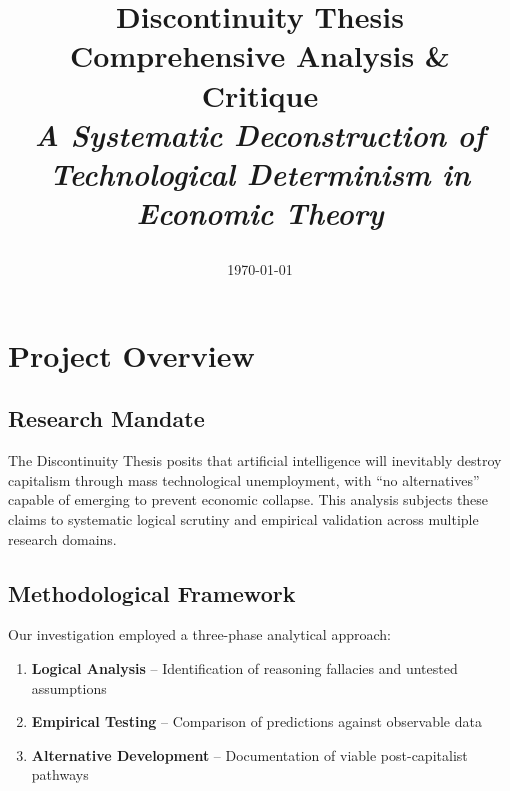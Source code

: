 \documentclass[11pt,a4paper]{article}
\title{
  \vspace{-1in}
  \begin{flushleft}
  \Huge\textbf{\textcolor{primaryblue}{Discontinuity Thesis}} \\
  \Large\textbf{\textcolor{secondaryblue}{Comprehensive Analysis \& Critique}} \\
  \vspace{0.5cm}
  \large\textit{A Systematic Deconstruction of Technological Determinism in Economic Theory}
  \end{flushleft}
}
\author{}
\date{\today}
\newcommand{\emphasis}[1]{\textbf{\textcolor{primaryblue}{#1}}}
\begin{document}
\maketitle
\thispagestyle{empty}

\begin{center}
\end{center}

\vspace{1cm}

\section{Project Overview}

\subsection{Research Mandate}

The Discontinuity Thesis posits that artificial intelligence will inevitably destroy capitalism through mass technological unemployment, with ``no alternatives'' capable of emerging to prevent economic collapse. This analysis subjects these claims to systematic logical scrutiny and empirical validation across multiple research domains.

\subsection{Methodological Framework}

Our investigation employed a three-phase analytical approach:

\begin{enumerate}[leftmargin=*]
\item \emphasis{Logical Analysis} -- Identification of reasoning fallacies and untested assumptions
\item \emphasis{Empirical Testing} -- Comparison of predictions against observable data
\item \emphasis{Alternative Development} -- Documentation of viable post-capitalist pathways
\end{enumerate}
\end{document}
